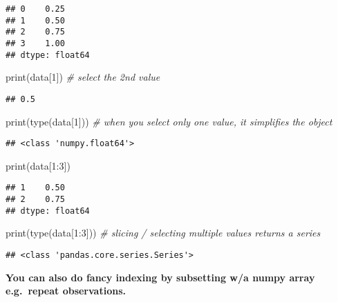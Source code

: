 \documentclass[
]{book}
\newenvironment{Shaded}{\begin{snugshade}}{\end{snugshade}}
\newcommand{\BuiltInTok}[1]{#1}
\newcommand{\CommentTok}[1]{\textcolor[rgb]{0.56,0.35,0.01}{\textit{#1}}}
\newcommand{\DecValTok}[1]{\textcolor[rgb]{0.00,0.00,0.81}{#1}}
\newcommand{\NormalTok}[1]{#1}
\begin{document}
\begin{verbatim}
## 0    0.25
## 1    0.50
## 2    0.75
## 3    1.00
## dtype: float64
\end{verbatim}

\begin{Shaded}
\begin{Highlighting}[]
\BuiltInTok{print}\NormalTok{(data[}\DecValTok{1}\NormalTok{]) }\CommentTok{\# select the 2nd value}
\end{Highlighting}
\end{Shaded}

\begin{verbatim}
## 0.5
\end{verbatim}

\begin{Shaded}
\begin{Highlighting}[]
\BuiltInTok{print}\NormalTok{(}\BuiltInTok{type}\NormalTok{(data[}\DecValTok{1}\NormalTok{])) }\CommentTok{\# when you select only one value, it simplifies the object}
\end{Highlighting}
\end{Shaded}

\begin{verbatim}
## <class 'numpy.float64'>
\end{verbatim}

\begin{Shaded}
\begin{Highlighting}[]
\BuiltInTok{print}\NormalTok{(data[}\DecValTok{1}\NormalTok{:}\DecValTok{3}\NormalTok{])}
\end{Highlighting}
\end{Shaded}

\begin{verbatim}
## 1    0.50
## 2    0.75
## dtype: float64
\end{verbatim}

\begin{Shaded}
\begin{Highlighting}[]
\BuiltInTok{print}\NormalTok{(}\BuiltInTok{type}\NormalTok{(data[}\DecValTok{1}\NormalTok{:}\DecValTok{3}\NormalTok{])) }\CommentTok{\# slicing / selecting multiple values returns a series}
\end{Highlighting}
\end{Shaded}

\begin{verbatim}
## <class 'pandas.core.series.Series'>
\end{verbatim}

\textbf{You can also do fancy indexing by subsetting w/a numpy array e.g.~repeat observations.}
\end{document}
